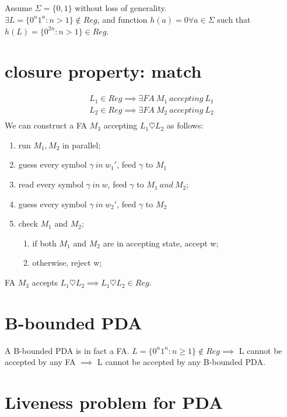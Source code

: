 \documentclass{article}
\begin{document}
\subsection{}

Assume $ \Sigma = \{0, 1\} $ without loss of generality.\\
$ \exists L = \{0^n1^n: n>1\} \notin Reg $, and function $ h(a) = 0 \forall a \in \Sigma $ such that $ h(L) = \{0^{2n}: n>1\} \in Reg $.

\section{closure property: match}

\begin{align*}
L_1 \in Reg \implies \exists FA \ M_1 \ accepting \ L_1\\
L_2 \in Reg \implies \exists FA \ M_2 \ accepting \ L_2\\
\end{align*}
We can construct a FA $ M_3 $ accepting $ L_1 \heartsuit L_2 $ as follows:
\begin{enumerate}
	\item run $ M_1, M_2 $ in parallel;
	\item guess every symbol $ \gamma \ in \ w_1' $, feed $ \gamma $ to $ M_1 $
	\item read every symbol $ \gamma \ in \ w $, feed $ \gamma $ to $ M_1 \ and \ M_2 $;
	\item guess every symbol $ \gamma \ in \ w_2' $, feed $ \gamma $ to $ M_2 $
	\item check $ M_1 $ and $ M_2 $;
	\begin{enumerate}
		\item if both $ M_1  $ and $ M_2 $ are in accepting state, accept w;
		\item otherwise, reject w;	
	\end{enumerate}
\end{enumerate}
FA $ M_3 $ accepts $ L_1 \heartsuit L_2 \implies L_1 \heartsuit L_2 \in Reg$.

\section{B-bounded PDA}

A B-bounded PDA is in fact a FA. $ L = \{0^n1^n: n \geq 1\} \notin Reg \implies$ L cannot be accepted by any FA $ \implies $ L cannot be accepted by any B-bounded PDA.

\section{Liveness problem for PDA}
\end{document}
